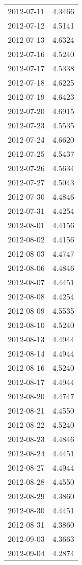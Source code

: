 \begin{tabular}{lr}
2012-07-11 &      4.3466 \\
2012-07-12 &      4.5141 \\
2012-07-13 &      4.6324 \\
2012-07-16 &      4.5240 \\
2012-07-17 &      4.5338 \\
2012-07-18 &      4.6225 \\
2012-07-19 &      4.6423 \\
2012-07-20 &      4.6915 \\
2012-07-23 &      4.5535 \\
2012-07-24 &      4.6620 \\
2012-07-25 &      4.5437 \\
2012-07-26 &      4.5634 \\
2012-07-27 &      4.5043 \\
2012-07-30 &      4.4846 \\
2012-07-31 &      4.4254 \\
2012-08-01 &      4.4156 \\
2012-08-02 &      4.4156 \\
2012-08-03 &      4.4747 \\
2012-08-06 &      4.4846 \\
2012-08-07 &      4.4451 \\
2012-08-08 &      4.4254 \\
2012-08-09 &      4.5535 \\
2012-08-10 &      4.5240 \\
2012-08-13 &      4.4944 \\
2012-08-14 &      4.4944 \\
2012-08-16 &      4.5240 \\
2012-08-17 &      4.4944 \\
2012-08-20 &      4.4747 \\
2012-08-21 &      4.4550 \\
2012-08-22 &      4.5240 \\
2012-08-23 &      4.4846 \\
2012-08-24 &      4.4451 \\
2012-08-27 &      4.4944 \\
2012-08-28 &      4.4550 \\
2012-08-29 &      4.3860 \\
2012-08-30 &      4.4451 \\
2012-08-31 &      4.3860 \\
2012-09-03 &      4.3663 \\
2012-09-04 &      4.2874 \\

\end{tabular}
